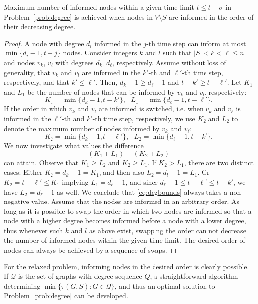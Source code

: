 \begin{lemma}
\label{lemma:degorder}
Maximum number of informed nodes within a given time limit $t\leq \bar{t} - \sigma$ in Problem~\ref{prob:degree} is achieved when nodes in $V\setminus S$ are informed 
in the order of their decreasing degree.
\end{lemma}
\begin{proof}

A node with degree $d_i$ informed in the $j$-th time step can inform at most $\min\{d_i-1,t-j\}$ nodes.
Consider integers  $k$ and $l$ such that $|S|< k < \ell\leq n$ and nodes $v_k$, $v_\ell$ with degrees $d_k$, $d_\ell$, respectively.
Assume without loss of generality, that $v_k$ and $v_l$ are informed in the $k'$-th and $\ell'$-th time step, respectively, and that $k'\leq\ell'$.
Then, $d_k-1\geq d_\ell-1$ and $t-k' \geq t-\ell'$.
Let $K_1$ and $L_1$ be the number of nodes that can be informed by $v_k$ and $v_l$, respectively:
$$
K_1=\min\{d_k-1,t-k'\}, ~~~ L_1=\min\{d_\ell-1,t-\ell'\}.
$$
If the order in which $v_k$ and $v_l$ are informed is switched, i.e. when $v_k$ and $v_\ell$ is informed in the $\ell'$-th and $k'$-th time step, respectively, 
we use $K_2$ and $L_2$ to denote the maximum number of nodes informed by $v_k$ and $v_\ell$:
$$
K_2=\min\{d_k-1,t-\ell'\}, ~~~ L_2=\min\{d_\ell-1,t-k'\}.
$$
We now investigate what values the difference 
\begin{equation}
\label{eq:degbounds}
(K_1+L_1)-(K_2+L_2)
\end{equation}
can attain.
Observe that $K_1\geq L_2$ and $K_2\geq L_1$. 
If $K_2>L_1$, there are two distinct cases:
Either $K_2=d_k-1=K_1$, and then also $L_2=d_l-1=L_1$.
	Or $K_2=t-\ell'\leq K_1$ implying $L_1 =d_\ell-1$, and since $d_\ell-1\leq t-\ell'\leq t-k'$, we have $L_2=d_\ell-1$ as well.
We conclude that \eqref{eq:degbounds} always takes a non-negative value.
Assume that the nodes are informed in an arbitrary order.
As long as it is possible to swap the order in which two nodes are informed so that a node with a higher degree becomes informed before a node with a lower degree,
thus whenever such $k$ and $l$ as above exist, swapping the order can not decrease the number of informed nodes within the given time limit.
The desired order of nodes can always be achieved by a sequence of swaps.
\end{proof}
For the relaxed problem, informing nodes in the desired order is clearly possible.
If $\mathcal{Q}$ is the set of graphs with degree sequence $Q$, a straightforward algorithm determining
$\min\{\tau(G,S): G\in \mathcal{Q}\}$,
and thus an optimal solution to Problem~\ref{prob:degree} can be developed.

